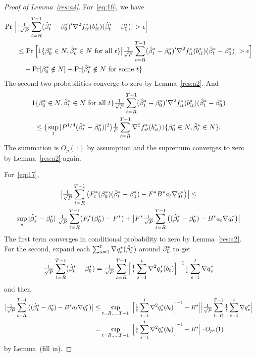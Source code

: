 \documentclass[12pt,fleqn]{article}
\begin{document}
\begin{proof}[Proof of Lemma~\ref{res:a4}]
For~\eqref{eq:16}, we have
\begin{align*}
  \pr\Big[& \big|\oclt{t} (\bh_t^* - \btrue^*)' \nabla^2 f_{it}^*(b_{it}^*) (\bh_t^* - \btrue^*) \big| > \epsilon \Big] \\
  &\leq \pr\Big[1\{\btrue^* \in N, \bh_t^* \in N\ \text{for all}\ t\} \big|\oclt{t} (\bh_t^* - \btrue^*)' \nabla^2 f_{it}^*(b_{it}^*) (\bh_t^* - \btrue^*) \big| > \epsilon \Big] \\
  &\quad + \pr[\btrue^* \notin N] + \pr[\bh_t^* \notin N\ \text{for some}\ t\}
\end{align*}
The second two probabilities converge to zero by
Lemma~\ref{res:a2}. And
\begin{multline*}
  1\{\beta_0^* \in N, \hat \beta_t^* \in N\ \text{for all}\ t\}
  \tfrac{1}{\sqrt{P}} \sum_{t=R}^{T-1} (\hat \beta_t^* - \beta_0^*)' \nabla^2 f_{it}^*(b_{it}^*) (\hat \beta_t^* - \beta_0^*)
  \\ \leq
  \big(\sup_t |P^{1/4}(\hat \beta_t^* - \beta_0^*)|^2\big) \tfrac{1}{P} \sum_{t=R}^{T-1}  \nabla^2 f_{it}^*(b_{it}^*) 1\{\beta_0^* \in N, \hat \beta_t^* \in N\}.
\end{multline*}
The summation is $O_p(1)$ by assumption and the supremum converges to
zero by Lemma~\ref{res:a2} again.

For~\eqref{eq:17},
\begin{multline*}
  \big\lvert \tfrac{1}{\sqrt{P}} \sum_{t=R}^{T-1} \big(F_t^*(\beta_0^*) (\hat \beta_t^* - \beta_0^*) - F^* B^* a_t \nabla q_t^*\big) \big\rvert \leq \\
   \sup_s |\hat \beta_s^* - \beta_0^*|\; \tfrac{1}{\sqrt{P}} \sum_{t=R}^{T-1} (F_t^*(\beta_0^*) - F^*)
  + \big\lvert F^* \tfrac{1}{\sqrt{P}} \sum_{t=R}^{T-1} \big((\hat \beta_t^* - \beta_0^*) - B^* a_t \nabla q_t^*\big) \big\rvert
\end{multline*}
The first term converges in conditional probability to zero by
Lemma~\ref{res:a2}.  For the second, expand each $\sum_{s=1}^t \nabla
q_s^*(\hat \beta_t^*)$ around $\beta_0^*$ to get
\begin{equation*}
  \tfrac{1}{\sqrt{P}} \sum_{t=R}^{T-1} (\hat \beta_t^* - \beta_0^*)
  = \tfrac{1}{\sqrt{P}} \sum_{t=R}^{T-1} \Big[\tfrac{1}{t} \sum_{s=1}^t \nabla^2 q_s^*(b_t)\Big]^{-1} \tfrac{1}{t} \sum_{s=1}^t \nabla q_s^*
\end{equation*}
and then
\begin{align*}
  \big\lvert \tfrac{1}{\sqrt{P}} \sum_{t=R}^{T-1} \big((\hat \beta_t^* - \beta_0^*) - B^* a_t \nabla q_t^*\big) \big\rvert
  &\leq \sup_{t=R,\dots,T-1} \Big\lvert\Big[\tfrac{1}{t} \sum_{s=1}^t \nabla^2 q_s^*(b_t)\Big]^{-1} - B^*\Big\rvert
  \Big\lvert\tfrac{1}{\sqrt{P}} \sum_{t=R}^{T-1} \tfrac{1}{t} \sum_{s=1}^t \nabla q_s^* \Big\rvert \\
  &= \sup_{t=R,\dots,T-1} \Big\lvert\Big[\tfrac{1}{t} \sum_{s=1}^t \nabla^2 q_s^*(b_t)\Big]^{-1} - B^*\Big\rvert \cdot O_{p^*}(1)
\end{align*}
by Lemma~(fill in).


\end{proof}
\end{document}

